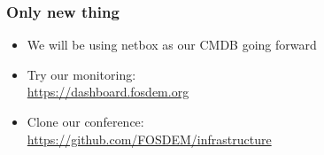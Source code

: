 \documentclass[aspectratio=169]{beamer}
\begin{document}
\begin{frame}
	\frametitle{Only new thing}
	\vfill
	\begin{itemize}
		\item We will be using netbox as our CMDB going forward
		\item Try our monitoring: \\ \url{https://dashboard.fosdem.org}
		\item Clone our conference: \\ \url{https://github.com/FOSDEM/infrastructure}
	\end{itemize}
	\vfill
\end{frame}
\end{document}

